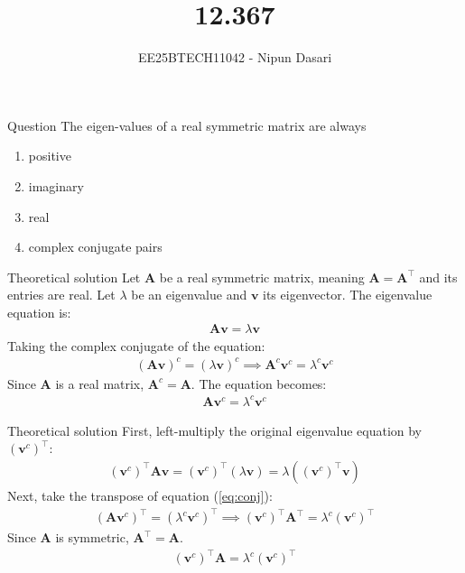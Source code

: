 \documentclass{beamer}
\title{12.367}
\author{EE25BTECH11042 - Nipun Dasari}
\numberwithin{equation}{section}
\theoremstyle{remark}
\let\vec\mathbf
\begin{document}
	
	\begin{frame}
		\titlepage
	\end{frame}
	
	\begin{frame}{Question}
		The eigen-values of a real symmetric matrix are always
		\begin{enumerate}[label=\alph*)]
			\item positive
			\item imaginary
			\item real
			\item complex conjugate pairs
		\end{enumerate}
	\end{frame}
	
	\begin{frame}{Theoretical solution}
		Let $\vec{A}$ be a real symmetric matrix, meaning $\vec{A} = \vec{A}^\top$ and its entries are real. Let $\lambda$ be an eigenvalue and $\vec{v}$ its eigenvector. The eigenvalue equation is:
		\begin{align}
			\vec{A}\vec{v} = \lambda\vec{v}
		\end{align}
		Taking the complex conjugate of the equation:
		\begin{align}
			(\vec{A}\vec{v})^c = (\lambda\vec{v})^c \implies \vec{A}^c\vec{v}^c = \lambda^c\vec{v}^c
		\end{align}
		Since $\vec{A}$ is a real matrix, $\vec{A}^c = \vec{A}$. The equation becomes:
		\begin{align}
			\vec{A}\vec{v}^c = \lambda^c\vec{v}^c \label{eq:conj}
		\end{align}
	\end{frame}
	
	\begin{frame}{Theoretical solution}
		First, left-multiply the original eigenvalue equation by $(\vec{v}^c)^\top$:
		\begin{align}
			(\vec{v}^c)^\top\vec{A}\vec{v} = (\vec{v}^c)^\top(\lambda\vec{v}) = \lambda((\vec{v}^c)^\top\vec{v}) \label{eq:first}
		\end{align}
		Next, take the transpose of equation (\ref{eq:conj}):
		\begin{align}
			(\vec{A}\vec{v}^c)^\top = (\lambda^c\vec{v}^c)^\top \implies (\vec{v}^c)^\top\vec{A}^\top = \lambda^c(\vec{v}^c)^\top
		\end{align}
		Since $\vec{A}$ is symmetric, $\vec{A}^\top = \vec{A}$.
		\begin{align}
			(\vec{v}^c)^\top\vec{A} = \lambda^c(\vec{v}^c)^\top
		\end{align}
	\end{frame}
	
\end{document}
